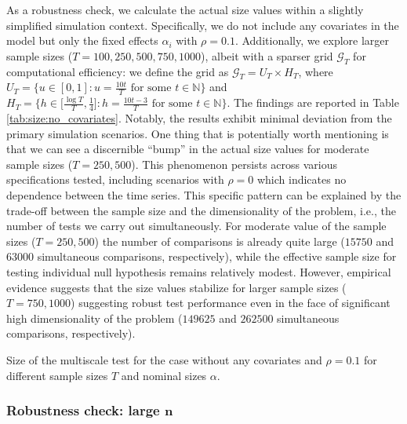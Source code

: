 \documentclass[a4paper,12pt]{article}
\begin{document}
As a robustness check, we calculate the actual size values within a slightly simplified simulation context. Specifically, we do not include any covariates in the model but only the fixed effects $\alpha_i$ with $\rho = 0.1$. Additionally, we explore larger sample sizes ($T=100, 250, 500, 750, 1000$), albeit with a sparser grid $\mathcal{G}_T$ for computational efficiency: we define the grid as $\mathcal{G}_T = U_T \times H_T$, where $U_T = \big\{ u \in [0,1]: u = \textstyle{\frac{10t}{T}} \text{ for some } t \in \mathbb{N} \big\}$ and $H_T = \big\{ h \in \big[ \textstyle{\frac{\log T}{T}}, \textstyle{\frac{1}{4}} \big]:  h = \textstyle{\frac{10t - 3}{T}} \text{ for some } t \in \mathbb{N} \big\}$. The findings are reported in Table \ref{tab:size:no_covariates}. Notably, the results exhibit minimal deviation from the primary simulation scenarios. One thing that is potentially worth mentioning is that we can see a discernible ``bump'' in the actual size values for moderate sample sizes ($T = 250, 500$). This phenomenon persists across various specifications tested, including scenarios with $\rho = 0$ which indicates no dependence between the time series. This specific pattern can be explained by the trade-off between the sample size and the dimensionality of the problem, i.e., the number of tests we carry out simultaneously. For moderate value of the sample sizes ($T =250, 500$) the number of comparisons is already quite large ($15750$ and $63000$ simultaneous comparisons, respectively), while the effective sample size for testing individual null hypothesis remains relatively modest. However, empirical evidence suggests that the size values stabilize for larger sample sizes ($T = 750, 1000$) suggesting robust test performance even in the face of significant high dimensionality of the problem ($149625 $ and $262500$ simultaneous comparisons, respectively).

\addtocounter{table}{-1} 
\begin{table}[t]
\footnotesize{
\begin{center}
\caption{Size of the multiscale test for the case without any covariates and $\rho = 0.1$ for different sample sizes $T$ and nominal sizes $\alpha$.}
\label{tab:size:no_covariates}
\renewcommand{\arraystretch}{1.2}

\end{center}}
\vspace{-0.4cm}
\end{table}


\subsubsection*{Robustness check: large $\boldsymbol{n}$}
\end{document}
